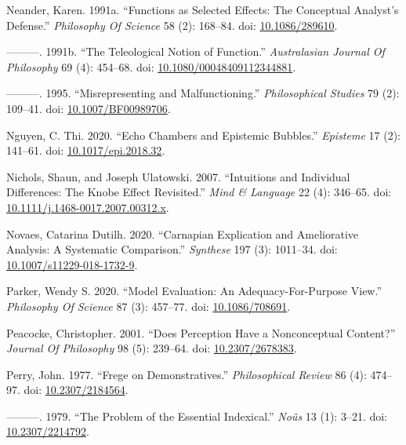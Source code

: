 \documentclass[
  10pt,
  letterpaper,
  DIV=11,
  numbers=noendperiod,
  twoside]{scrartcl}
\newlength{\cslhangindent}
\newenvironment{CSLReferences}[2] %
 {\begin{list}{}{%
  \setlength{\itemindent}{0pt}
  \setlength{\leftmargin}{0pt}
  \setlength{\parsep}{0pt}
  \ifodd #1
   \setlength{\leftmargin}{\cslhangindent}
   \setlength{\itemindent}{-1\cslhangindent}
  \fi
  \setlength{\itemsep}{#2\baselineskip}}}
 {\end{list}}
\begin{document}
\begin{CSLReferences}{1}{0}
Neander, Karen. 1991a. {``Functions as Selected Effects: The Conceptual
Analyst's Defense.''} \emph{Philosophy Of Science} 58 (2): 168--84. doi:
\href{https://doi.org/10.1086/289610}{10.1086/289610}.

---------. 1991b. {``The Teleological Notion of Function.''}
\emph{Australasian Journal Of Philosophy} 69 (4): 454--68. doi:
\href{https://doi.org/10.1080/00048409112344881}{10.1080/00048409112344881}.

---------. 1995. {``Misrepresenting and Malfunctioning.''}
\emph{Philosophical Studies} 79 (2): 109--41. doi:
\href{https://doi.org/10.1007/BF00989706}{10.1007/BF00989706}.

Nguyen, C. Thi. 2020. {``Echo Chambers and Epistemic Bubbles.''}
\emph{Episteme} 17 (2): 141--61. doi:
\href{https://doi.org/10.1017/epi.2018.32}{10.1017/epi.2018.32}.

Nichols, Shaun, and Joseph Ulatowski. 2007. {``Intuitions and Individual
Differences: The Knobe Effect Revisited.''} \emph{Mind \& Language} 22
(4): 346--65. doi:
\href{https://doi.org/10.1111/j.1468-0017.2007.00312.x}{10.1111/j.1468-0017.2007.00312.x}.

Novaes, Catarina Dutilh. 2020. {``Carnapian Explication and Ameliorative
Analysis: A Systematic Comparison.''} \emph{Synthese} 197 (3): 1011--34.
doi:
\href{https://doi.org/10.1007/s11229-018-1732-9}{10.1007/s11229-018-1732-9}.

Parker, Wendy S. 2020. {``Model Evaluation: An Adequacy-For-Purpose
View.''} \emph{Philosophy Of Science} 87 (3): 457--77. doi:
\href{https://doi.org/10.1086/708691}{10.1086/708691}.

Peacocke, Christopher. 2001. {``Does Perception Have a Nonconceptual
Content?''} \emph{Journal Of Philosophy} 98 (5): 239--64. doi:
\href{https://doi.org/10.2307/2678383}{10.2307/2678383}.

Perry, John. 1977. {``Frege on Demonstratives.''} \emph{Philosophical
Review} 86 (4): 474--97. doi:
\href{https://doi.org/10.2307/2184564}{10.2307/2184564}.

---------. 1979. {``The Problem of the Essential Indexical.''}
\emph{Noûs} 13 (1): 3--21. doi:
\href{https://doi.org/10.2307/2214792}{10.2307/2214792}.


\end{CSLReferences}
\end{document}

